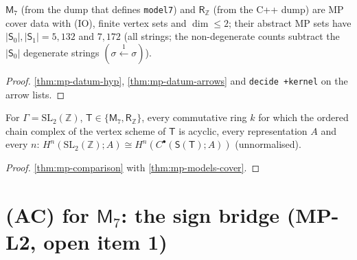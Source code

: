 \begin{theorem}\label{thm:mp-models-cover}
  \leanok
  $\mathsf M_7$ (from the dump that defines \texttt{model7}) and $\mathsf R_{\mathbb Z}$ (from the C++ dump) are MP cover data with
  (IO), finite vertex sets and $\dim\le2$; their abstract MP sets have $\lvert\mathsf S_0\rvert,\lvert\mathsf S_1\rvert=5,132$ and
  $7,172$ (all strings; the non-degenerate counts subtract the $\lvert\mathsf S_0\rvert$ degenerate strings $(\sigma\xleftarrow{1}\sigma)$).
\end{theorem}
\begin{proof}
  \leanok
  \ref{thm:mp-datum-hyp}, \ref{thm:mp-datum-arrows} and \texttt{decide +kernel} on the arrow lists.
\end{proof}

\begin{theorem}\label{thm:mp-models-comparison}
  \leanok
  For $\Gamma=\mathrm{SL}_2(\mathbb Z)$, $\mathsf T\in\{\mathsf M_7,\mathsf R_{\mathbb Z}\}$, every commutative ring $k$ for which the
  ordered chain complex of the vertex scheme of $\mathsf T$ is acyclic, every representation $A$ and every $n$:
  $H^n(\mathrm{SL}_2(\mathbb Z);A)\cong H^n(C^\bullet(\mathsf S(\mathsf T);A))$ (unnormalised).
\end{theorem}
\begin{proof}
  \leanok
  \ref{thm:mp-comparison} with \ref{thm:mp-models-cover}.
\end{proof}

\section{(AC) for $\mathsf M_7$: the sign bridge (MP-L2, open item 1)}

